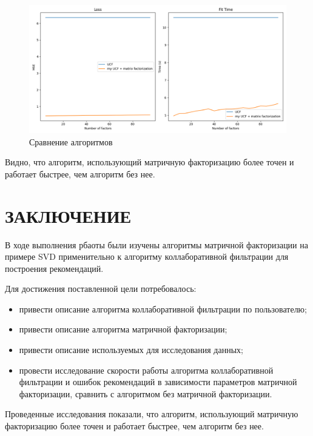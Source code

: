 \documentclass[12pt]{report}
\begin{document}
\begin{figure}[H]
	\centering
	\includegraphics[width=\textwidth]{inc/res.png}
	\caption{Сравнение алгоритмов}
	\label{img:time4}
\end{figure}


Видно, что алгоритм, использующий матричную факторизацию более точен и работает быстрее, чем алгоритм без нее.


\chapter*{ЗАКЛЮЧЕНИЕ}
В ходе выполнения рбаоты были изучены алгоритмы матричной факторизации на примере SVD применительно к алгоритму коллаборативной фильтрации для построения рекомендаций.

Для достижения поставленной цели потребовалось:
\begin{itemize}
	\item привести описание алгоритма коллаборативной фильтрации по пользователю;
    \item привести описание алгоритма матричной факторизации;
	\item привести описание используемых для исследования данных;
	\item провести исследование скорости работы алгоритма коллаборативной фильтрации и ошибок рекомендаций в зависимости параметров матричной факторизации, сравнить с алгоритмом без матричной факторизации.
\end{itemize}

Проведенные исследования показали, что алгоритм, использующий матричную факторизацию более точен и работает быстрее, чем алгоритм без нее.

\pagebreak

\printbibliography[title={СПИСОК ИСПОЛЬЗОВАННЫХ\\ ИСТОЧНИКОВ}]


\pagebreak
\end{document}
